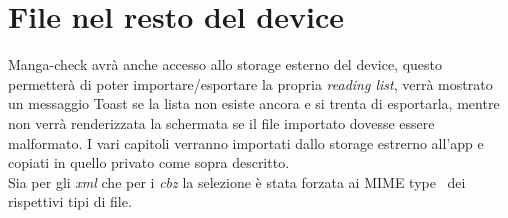 \documentclass[../Assignment-3-LPSMT.tex]{subfiles}
\begin{document}
\section{File nel resto del device}

Manga-check avrà anche accesso allo storage esterno del device, questo permetterà di poter importare/esportare la propria \emph{reading list}, verrà mostrato un messaggio Toast se la lista non esiste ancora e si trenta di esportarla, mentre non verrà renderizzata la schermata se il file importato dovesse essere malformato.
I vari capitoli verranno importati dallo storage estrerno all'app e copiati in quello privato come sopra descritto.\\
Sia per gli \emph{xml} che per i \emph{cbz} la selezione è stata forzata ai MIME type~\cite{rfc6838} dei rispettivi tipi di file.
\end{document}
